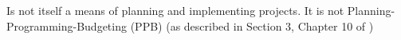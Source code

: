 Is not itself a means of planning and implementing projects. It is not Planning-Programming-Budgeting (PPB) (as described in Section 3, Chapter 10 of \cite{robinsonDecisionmakingUrbanPlanning1972})



%
%
%
